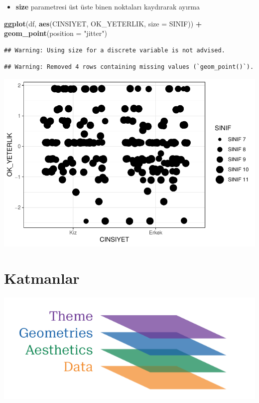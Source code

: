 \documentclass[
  oneside]{book}
\newenvironment{Shaded}{\begin{snugshade}}{\end{snugshade}}
\newcommand{\AttributeTok}[1]{\textcolor[rgb]{0.13,0.29,0.53}{#1}}
\newcommand{\FunctionTok}[1]{\textcolor[rgb]{0.13,0.29,0.53}{\textbf{#1}}}
\newcommand{\NormalTok}[1]{#1}
\newcommand{\SpecialCharTok}[1]{\textcolor[rgb]{0.81,0.36,0.00}{\textbf{#1}}}
\newcommand{\StringTok}[1]{\textcolor[rgb]{0.31,0.60,0.02}{#1}}
\providecommand{\tightlist}{%
  \setlength{\itemsep}{0pt}\setlength{\parskip}{0pt}}
\begin{document}
\begin{itemize}
\tightlist
\item
  \textbf{size} parametresi üst üste binen noktaları kaydırarak ayırma
\end{itemize}

\begin{Shaded}
\begin{Highlighting}[]
\FunctionTok{ggplot}\NormalTok{(df, }\FunctionTok{aes}\NormalTok{(CINSIYET, OK\_YETERLIK, }\AttributeTok{size =}\NormalTok{ SINIF)) }\SpecialCharTok{+}
  \FunctionTok{geom\_point}\NormalTok{(}\AttributeTok{position =} \StringTok{"jitter"}\NormalTok{)}
\end{Highlighting}
\end{Shaded}

\begin{verbatim}
## Warning: Using size for a discrete variable is not advised.
\end{verbatim}

\begin{verbatim}
## Warning: Removed 4 rows containing missing values (`geom_point()`).
\end{verbatim}

\begin{center}\includegraphics[width=1\linewidth]{15-betimleyici-istatistik_files/figure-latex/unnamed-chunk-46-1} \end{center}

\hypertarget{katmanlar}{%
\section{Katmanlar}\label{katmanlar}}

\includegraphics{images/v4.PNG}
\end{document}

